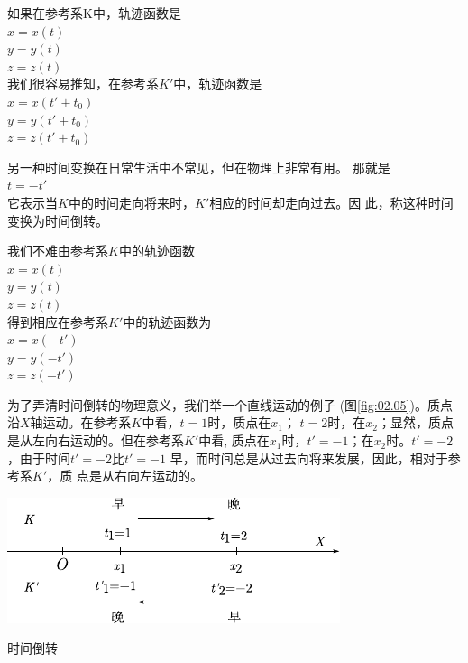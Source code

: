 如果在参考系K中，轨迹函数是\vspace{-0.2em}
\\\null\hspace{6em}$x=x(t)$
\\\null\hspace{6em}$y=y(t)$
\\\null\hspace{6em}$z=z(t)$\\
我们很容易推知，在参考系$K'$中，轨迹函数是\vspace{-0.2em}
\\\null\hspace{6em}$x=x(t'+t_0)$
\\\null\hspace{6em}$y=y(t'+t_0)$
\\\null\hspace{6em}$z=z(t'+t_0)$

另一种时间变换在日常生活中不常见，但在物理上非常有用。
那就是\vspace{-0.5em}
\\\null\hspace{6em}$t=-t'$\\
它表示当$K$中的时间走向将来时，$K'$相应的时间却走向过去。因
此，称这种时间变换为时间倒转。

我们不难由参考系$K$中的轨迹函数\vspace{-0.2em}
\\\null\hspace{6em}$x=x(t)$
\\\null\hspace{6em}$y=y(t)$
\\\null\hspace{6em}$z=z(t)$\\
得到相应在参考系$K'$中的轨迹函数为\vspace{-0.2em}
\\\null\hspace{6em}$x=x(-t')$
\\\null\hspace{6em}$y=y(-t')$
\\\null\hspace{6em}$z=z(-t')$

为了弄清时间倒转的物理意义，我们举一个直线运动的例子
(图\ref{fig:02.05})。质点沿$X$轴运动。在参考系$K$中看，$t=1$时，质点在$x_1$；
$t=2$时，在$x_2$；显然，质点是从左向右运动的。但在参考系$K'$中看,
质点在$x_1$时，$t'=-1$；在$x_2$时。$t'=-2$，由于时间$t'=-2$比$t'=-1$
早，而时间总是从过去向将来发展，因此，相对于参考系$K'$，质
点是从右向左运动的。
\begin{figurex}
    \centering
    \includegraphics{figure/fig02.05}
    \caption{时间倒转}
    \label{fig:02.05}
\end{figurex}
